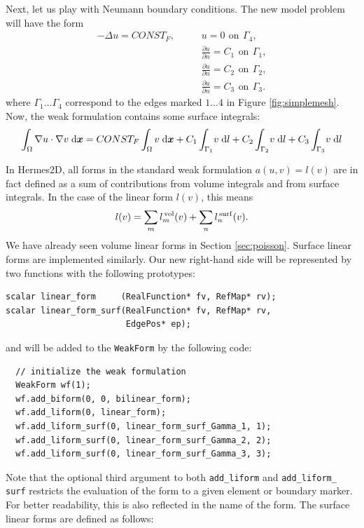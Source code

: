 \documentclass[11pt]{article}
\newcommand{\bfx}{\mbox{\boldmath $x$}}
\newcommand{\dd}[2]{\frac{\partial #1}{\partial #2}}
\begin{document}
Next, let us play with Neumann boundary conditions. The new model problem
will have the form
\begin{eqnarray*}
  -\Delta u = CONST_F,\ \ \ \ \ &&u = 0\,\ \mbox{on}\,\ \Gamma_4,\\
                           &&\dd{u}{n} = C_1\,\ \mbox{on}\,\ \Gamma_1,\\
                           &&\dd{u}{n} = C_2\,\ \mbox{on}\,\ \Gamma_2,\\
                           &&\dd{u}{n} = C_3\,\ \mbox{on}\,\ \Gamma_3.
\end{eqnarray*}
where $\Gamma_1 \dots \Gamma_4$ correspond to the edges marked $1 \dots 4$ in Figure
\ref{fig:simplemesh}. Now, the weak formulation contains some
surface integrals:
$$\int_\Omega \nabla u \cdot \nabla v \;\mbox{d\bfx} =
  CONST_F\int_\Omega v \;\mbox{d\bfx}
  + C_1\int_{\Gamma_1} \!v \;\mbox{d}l
  + C_2\int_{\Gamma_2} \!v \;\mbox{d}l
  + C_3\int_{\Gamma_3} \!v \;\mbox{d}l
$$

In Hermes2D, all forms in the standard weak formulation $a(u,v) = l(v)$
are in fact defined as a sum of contributions from volume integrals and from
surface integrals. In the case of the linear form $l(v)$, this means
$$l(v) = \sum_m l_m^{\,\rm vol}(v) + \sum_n l_n^{\,\rm surf}(v).$$
We have already seen volume linear forms in Section \ref{sec:poisson}.
Surface linear forms are implemented similarly. Our new right-hand side will
be represented by two functions with the following prototypes:

\begin{lstlisting}
scalar linear_form     (RealFunction* fv, RefMap* rv);
scalar linear_form_surf(RealFunction* fv, RefMap* rv,
                        EdgePos* ep);
\end{lstlisting}

and will be added to the {\tt WeakForm} by the following code:

\begin{lstlisting}
  // initialize the weak formulation
  WeakForm wf(1);
  wf.add_biform(0, 0, bilinear_form);
  wf.add_liform(0, linear_form);
  wf.add_liform_surf(0, linear_form_surf_Gamma_1, 1);
  wf.add_liform_surf(0, linear_form_surf_Gamma_2, 2);
  wf.add_liform_surf(0, linear_form_surf_Gamma_3, 3);
\end{lstlisting}

Note that the optional third argument to both {\tt add\_liform} and {\tt add\_liform\_ surf}
restricts the evaluation of the form to a given element or boundary marker.
For better readability, this is also reflected in the name of the form. The surface
linear forms are defined as follows:
\end{document}
